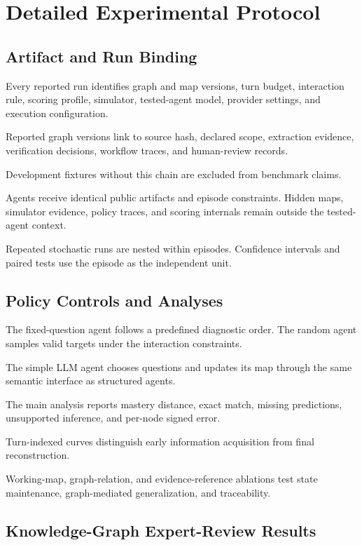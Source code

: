 \section{Detailed Experimental Protocol}
\label{app:experimental-protocol}

\subsection{Artifact and Run Binding}

Every reported run identifies graph and map versions, turn budget, interaction rule, scoring profile,
simulator, tested-agent model, provider settings, and execution configuration.

Reported graph versions link to source hash, declared scope, extraction evidence, verification
decisions, workflow traces, and human-review records.

Development fixtures without this chain are excluded from benchmark claims.

Agents receive identical public artifacts and episode constraints. Hidden maps, simulator evidence,
policy traces, and scoring internals remain outside the tested-agent context.

Repeated stochastic runs are nested within episodes. Confidence intervals and paired tests use the
episode as the independent unit.

\subsection{Policy Controls and Analyses}

The fixed-question agent follows a predefined diagnostic order. The random agent samples valid targets
under the interaction constraints.

The simple LLM agent chooses questions and updates its map through the same semantic interface as
structured agents.

The main analysis reports mastery distance, exact match, missing predictions, unsupported inference,
and per-node signed error.

Turn-indexed curves distinguish early information acquisition from final reconstruction.

Working-map, graph-relation, and evidence-reference ablations test state maintenance, graph-mediated
generalization, and traceability.

\subsection{Knowledge-Graph Expert-Review Results}
\label{app:graph-review-results}

